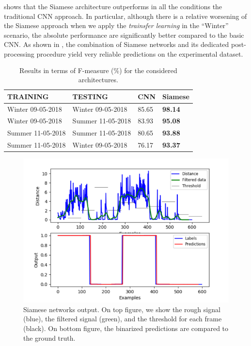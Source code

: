  shows that the Siamese architecture outperforms in all the conditions the traditional CNN approach. In particular, although there is a relative worsening of the Siamese approach when we apply the \textit{trainsfer learning} in the ``Winter'' scenario, the absolute performance are significantly better compared to the basic CNN. As shown in , the combination of Siamese networks and its dedicated post-processing procedure yield very reliable predictions on the experimental dataset.


\begin{table}[h]
	\centering
	\begin{tabular}{@{}ll|ll@{}}
		\toprule
		TRAINING          & TESTING           & CNN   & Siamese        \\ \midrule
		Winter 09-05-2018 & Winter 09-05-2018 & 85.65 & \textbf{98.14} \\
		Winter 09-05-2018 & Summer 11-05-2018 & 83.93 & \textbf{95.08} \\ \midrule
		Summer 11-05-2018 & Summer 11-05-2018 & 80.65 & \textbf{93.88} \\
		Summer 11-05-2018 & Winter 09-05-2018 & 76.17 & \textbf{93.37} \\ \bottomrule
	\end{tabular}
	\caption[Road Surface Roughness Classification - Results]{Results in terms of F-measure (\%) for the considered architectures.}
	\label{tab:road_results}
\end{table}



\begin{figure}
	\centering
	\includegraphics[width=0.7\columnwidth]{img/siamese_output}
	\caption[Siamese Nets Output]{Siamese networks output. On top figure, we show the rough signal (blue), the filtered signal (green), and the threshold for each frame (black). On bottom figure, the binarized predictions are compared to the ground truth.}
	\label{fig:siamese_output}
\end{figure}


